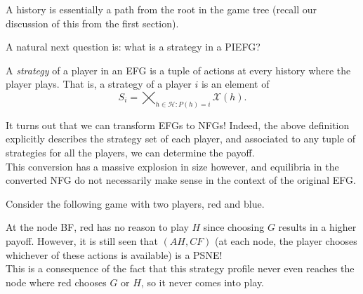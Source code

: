 	A history is essentially a path from the root in the game tree (recall our discussion of this from the first section).

	A natural next question is: what is a strategy in a PIEFG?

	\begin{fdef}[Strategy]
		A \emph{strategy} of a player in an EFG is a tuple of actions at every history where the player plays. That is, a strategy of a player $i$ is an element of
		\[ S_i = \bigtimes_{h \in \mathcal{H} : P(h) = i} \mathcal{X}(h). \]
	\end{fdef}

	It turns out that we can transform EFGs to NFGs! Indeed, the above definition explicitly describes the strategy set of each player, and associated to any tuple of strategies for all the players, we can determine the payoff.\\
	This conversion has a massive explosion in size however, and equilibria in the converted NFG do not necessarily make sense in the context of the original EFG.

	\begin{fex}
		Consider the following game with two players, red and blue.
		\begin{center}
		\end{center}
		At the node BF, red has no reason to play $H$ since choosing $G$ results in a higher payoff. However, it is still seen that $(AH,CF)$ (at each node, the player chooses whichever of these actions is available) is a PSNE!\\
		This is a consequence of the fact that this strategy profile never even reaches the node where red chooses $G$ or $H$, so it never comes into play.
	\end{fex}

